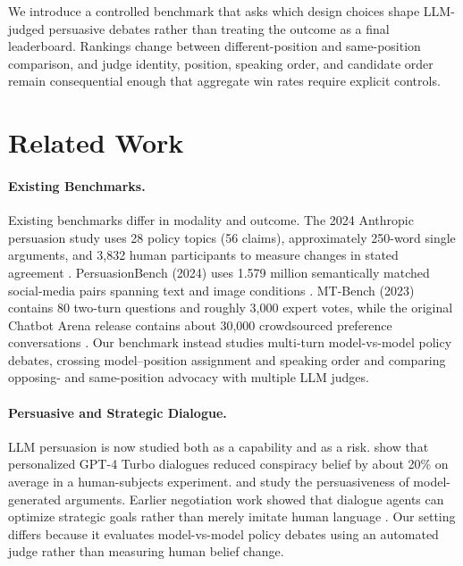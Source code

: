\documentclass{article}
\begin{document}
We introduce a controlled benchmark that asks which design choices shape LLM-judged persuasive debates rather than treating the outcome as a final leaderboard. Rankings change between different-position and same-position comparison, and judge identity, position, speaking order, and candidate order remain consequential enough that aggregate win rates require explicit controls.


\section{Related Work}

\paragraph{Existing Benchmarks.}
Existing benchmarks differ in modality and outcome. The 2024 Anthropic persuasion study uses 28 policy topics (56 claims), approximately 250-word single arguments, and 3,832 human participants to measure changes in stated agreement \citep{durmus2024persuasiveness}. PersuasionBench (2024) uses 1.579 million semantically matched social-media pairs spanning text and image conditions \citep{singh2024persuasionbench}. MT-Bench (2023) contains 80 two-turn questions and roughly 3,000 expert votes, while the original Chatbot Arena release contains about 30,000 crowdsourced preference conversations \citep{zheng2023judge}. Our benchmark instead studies multi-turn model-vs-model policy debates, crossing model--position assignment and speaking order and comparing opposing- and same-position advocacy with multiple LLM judges.

\paragraph{Persuasive and Strategic Dialogue.}
LLM persuasion is now studied both as a capability and as a risk. \citet{costello2024conspiracy} show that personalized GPT-4 Turbo dialogues reduced conspiracy belief by about 20\% on average in a human-subjects experiment. \citet{durmus2024persuasiveness} and \citet{singh2024persuasionbench} study the persuasiveness of model-generated arguments. Earlier negotiation work showed that dialogue agents can optimize strategic goals rather than merely imitate human language \citep{lewis2017deal}. Our setting differs because it evaluates model-vs-model policy debates using an automated judge rather than measuring human belief change.
\end{document}
